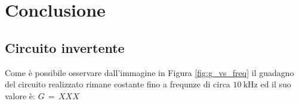 \section*{Conclusione}

\subsection*{Circuito invertente}

Come è possibile osservare dall'immagine in Figura \ref{fig:g_vs_freq} il guadagno del circuito realizzato rimane costante fino a frequnze di circa $\SI{10}{\kilo\hertz}$ ed il suo valore è: $G\,=\,XXX$
